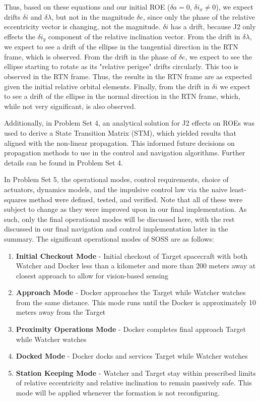 Thus, based on these equations and our initial ROE ($\delta a = 0$, $\delta i_x \neq 0$), we expect drifts $\delta i$ and $\delta \lambda$, but not in the magnitude $\delta e$, since only the phase of the relative eccentricity vector is changing, not the magnitude. $\delta i$ has a drift, because J2 only effects the $\delta i_y$ component of the relative inclination vector. From the drift in $\delta \lambda$, we expect to see a drift of the ellipse in the tangential direction in the RTN frame, which is observed. From the drift in the phase of $\delta e$, we expect to see the ellipse starting to rotate as its "relative perigee" drifts circularly. This too is observed in the RTN frame. Thus, the results in the RTN frame are as expected given the initial relative orbital elements. Finally, from the drift in $\delta i$ we expect to see a drift of the ellipse in the normal direction in the RTN frame, which, while not very significant, is also observed. 

Additionally, in Problem Set 4, an analytical solution for J2 effects on ROEs was used to derive a State Transition Matrix (STM), which yielded results that aligned with the non-linear propagation. This informed future decisions on propagation methods to use in the control and navigation algorithms. Further details can be found in Problem Set 4. 

In Problem Set 5, the operational modes, control requirements, choice of actuators, dynamics models, and the impulsive control law via the naive least-squares method were defined, tested, and verified. Note that all of these were subject to change as they were improved upon in our final implementation. As such, only the final operational modes will be discussed here, with the rest discussed in our final navigation and control implementation later in the summary. The significant operational modes of SOSS are as follows: 
\begin{enumerate}
\item \textbf{Initial Checkout Mode} - Initial checkout of Target spacecraft with both Watcher and Docker less than a kilometer and more than 200 meters away at closest approach to allow for vision-based sensing
\item \textbf{Approach Mode} - Docker approaches the Target while Watcher watches from the same distance. This mode runs until the Docker is approximately 10 meters away from the Target
\item \textbf{Proximity Operations Mode} - Docker completes final approach Target while Watcher watches
\item \textbf{Docked Mode} - Docker docks and services Target while Watcher watches
\item \textbf{Station Keeping Mode} - Watcher and Target stay within prescribed limits of relative eccentricity and relative inclination to remain passively safe. This mode will be applied whenever the formation is not reconfiguring. 
\end{enumerate}

